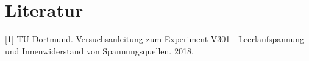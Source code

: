 \section{Literatur}

[1] TU Dortmund. Versuchsanleitung zum Experiment V301 - Leerlaufspannung und Innenwiderstand von Spannungsquellen. 2018.